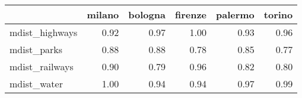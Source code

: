 \begin{tabular}{lrrrrr}
\toprule
{} &  milano &  bologna &  firenze &  palermo &  torino \\
\midrule
mdist\_highways &    0.92 &     0.97 &     1.00 &     0.93 &    0.96 \\
mdist\_parks    &    0.88 &     0.88 &     0.78 &     0.85 &    0.77 \\
mdist\_railways &    0.90 &     0.79 &     0.96 &     0.82 &    0.80 \\
mdist\_water    &    1.00 &     0.94 &     0.94 &     0.97 &    0.99 \\
\bottomrule
\end{tabular}
